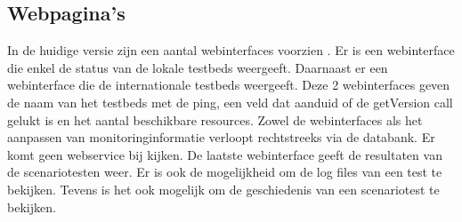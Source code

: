 \subsection{Webpagina\rq s}
\npar
In de huidige versie zijn een aantal webinterfaces voorzien\citep{FED4FIRE-doc} .
Er is een webinterface die enkel de status van de lokale testbeds weergeeft. Daarnaast er een webinterface die de internationale testbeds weergeeft. 
Deze 2 webinterfaces geven de naam van het testbeds met de ping, een veld dat aanduid of de getVersion call gelukt is en het aantal beschikbare resources.
\npar
\clearpage
Zowel de webinterfaces als het aanpassen van monitoringinformatie verloopt rechtstreeks via de databank. Er komt geen webservice bij kijken.
\npar
De laatste webinterface geeft de resultaten van de scenariotesten weer. Er is ook de mogelijkheid om de log files van een test te bekijken. Tevens is het ook mogelijk om de geschiedenis van een scenariotest te bekijken.
